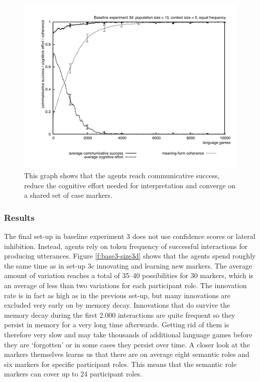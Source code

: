 \begin{figure}[ht]
\centerline{\includegraphics[width=\textwidth]{Chapter3/figs/graph-base3-effort3d}}
  \caption[Baseline experiment 3d: success, effort and coherence]{This graph shows that the agents reach communicative success, reduce the cognitive effort needed for interpretation and converge on a shared set of case markers.}
   \label{f:base3-effort3d}
\end{figure}

\subsubsection{Results}
 The final set-up in baseline experiment 3 does not use confidence scores or lateral inhibition. Instead, agents rely on token frequency of successful interactions for producing utterances. Figure \ref{f:base3-size3d} shows that the agents spend roughly the same time as in set-up 3c innovating and learning new markers. The average amount of variation reaches a total of 35--40 possibilities for 30 markers, which is an average of less than two variations for each participant role. The innovation rate is in fact as high as in the previous set-up, but many innovations are excluded very early on by memory decay. Innovations that do survive the memory decay during the first 2.000 interactions are quite frequent so they persist in memory for a very long time afterwards. Getting rid of them is therefore very slow and may take thousands of additional language games before they are `forgotten' or in some cases they persist over time. A closer look at the markers themselves learns us that there are on average eight semantic roles and six markers for specific participant roles. This means that the semantic role markers can cover up to 24 participant roles.

